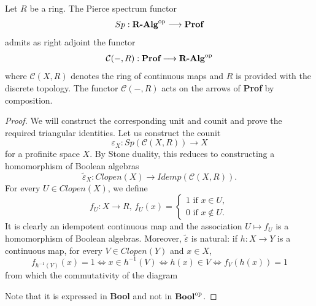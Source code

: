 \begin{proposition}
\label{prop:AdjointPierceSpectrum}
    Let $R$ be a ring. The Pierce spectrum functor
    \[ Sp:{\textbf{R-Alg}}^{\mathrm{op}}\longrightarrow\textbf{Prof} \]
    admits as right adjoint the functor
    \[ \mathcal{C}(-,R):\textbf{Prof}\longrightarrow{\textbf{R-Alg}}^{\mathrm{op}} \]
    where $\mathcal{C}(X,R)$ denotes the ring of continuous maps and $R$ is provided with the discrete topology. The functor $\mathcal{C}(-,R)$ acts on the arrows of \textbf{Prof} by composition.

    \begin{proof}
        We will construct the corresponding unit and counit and prove the required triangular identities. Let us construct the counit
        \[ \varepsilon_{X}:Sp(\mathcal{C}(X,R))\longrightarrow X \]
        for a profinite space $X$. By Stone duality, this reduces to constructing a homomorphism of Boolean algebras
        \[ \tilde{\varepsilon}_X:Clopen(X)\longrightarrow Idemp(\mathcal{C}(X,R)). \]
        For every $U\in Clopen(X)$, we define
        \[ f_U:X\longrightarrow R\text{, }f_U(x) = \begin{cases}
            1 \text{ if }x\in U,\\
            0 \text{ if }x\not\in U.
        \end{cases} \]
        It is clearly an idempotent continuous map and the association $U\mapsto f_U$ is a homomorphism of Boolean algebras. Moreover, $\tilde\varepsilon$ is natural: if $h:X\to Y$ is a continuous map, for every $V\in Clopen(Y)$ and $x\in X$,
        \[ f_{h^{-1}(V)}(x) = 1 \iff x \in h^{-1}(V) \iff h(x)\in V \iff f_{V}(h(x)) = 1 \]
        from which the commutativity of the diagram
        \begin{center}
        \end{center}
        Note that it is expressed in \textbf{Bool} and not in ${\textbf{Bool}}^{\mathrm{op}}$.
        

\end{proof}
\end{proposition}
